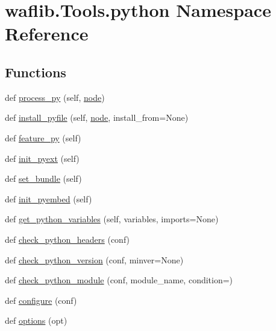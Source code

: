 \hypertarget{namespacewaflib_1_1_tools_1_1python}{}\section{waflib.\+Tools.\+python Namespace Reference}
\label{namespacewaflib_1_1_tools_1_1python}
\subsection*{Functions}
\begin{DoxyCompactItemize}
\item 
def \hyperlink{namespacewaflib_1_1_tools_1_1python_a71636ae0482b95c564b6d4187d0859e2}{process\+\_\+py} (self, \hyperlink{structnode}{node})
\item 
def \hyperlink{namespacewaflib_1_1_tools_1_1python_a058abbc5b39435a0b9e521b2c7469b0e}{install\+\_\+pyfile} (self, \hyperlink{structnode}{node}, install\+\_\+from=None)
\item 
def \hyperlink{namespacewaflib_1_1_tools_1_1python_acc4f408ad28420fd71f5d55e8460c860}{feature\+\_\+py} (self)
\item 
def \hyperlink{namespacewaflib_1_1_tools_1_1python_adfd20f1acfdfb23e2a6835e8f46380d8}{init\+\_\+pyext} (self)
\item 
def \hyperlink{namespacewaflib_1_1_tools_1_1python_a8871401a5a253c6c5f23b93abfc7c6ce}{set\+\_\+bundle} (self)
\item 
def \hyperlink{namespacewaflib_1_1_tools_1_1python_a57ee91575ef5da03257f030eeda97eb8}{init\+\_\+pyembed} (self)
\item 
def \hyperlink{namespacewaflib_1_1_tools_1_1python_a25e6fedc3ee179a0fd6941d4b9a4dc59}{get\+\_\+python\+\_\+variables} (self, variables, imports=None)
\item 
def \hyperlink{namespacewaflib_1_1_tools_1_1python_a02a439285fad316b6be47a63235641e6}{check\+\_\+python\+\_\+headers} (conf)
\item 
def \hyperlink{namespacewaflib_1_1_tools_1_1python_a384089b6d673ce03705110abb0b572c8}{check\+\_\+python\+\_\+version} (conf, minver=None)
\item 
def \hyperlink{namespacewaflib_1_1_tools_1_1python_a72e73914976ccc85f0013225e2fa0a3c}{check\+\_\+python\+\_\+module} (conf, module\+\_\+name, condition=\textquotesingle{}\textquotesingle{})
\item 
def \hyperlink{namespacewaflib_1_1_tools_1_1python_a4c940b786ec6ccb9dfbe0ad259793f85}{configure} (conf)
\item 
def \hyperlink{namespacewaflib_1_1_tools_1_1python_a1729b5b9d6f6a5972667bc5d2d1c5f0b}{options} (opt)
\end{DoxyCompactItemize}
